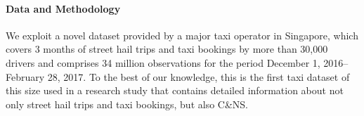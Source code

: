 \documentclass[reviewmode,AEJ]{AEA}
\begin{document}


\paragraph{Data and Methodology} We exploit a novel dataset provided by a major taxi operator in Singapore,
which covers 3 months of street hail trips and taxi bookings by more than 30,000 drivers and comprises 34
million observations for the period December 1, 2016--February 28, 2017. To the best of our knowledge, 
this is the first taxi dataset of this size used in a research study that contains detailed information 
about not only street hail trips and taxi bookings, but also C\&NS. 
\end{document}
